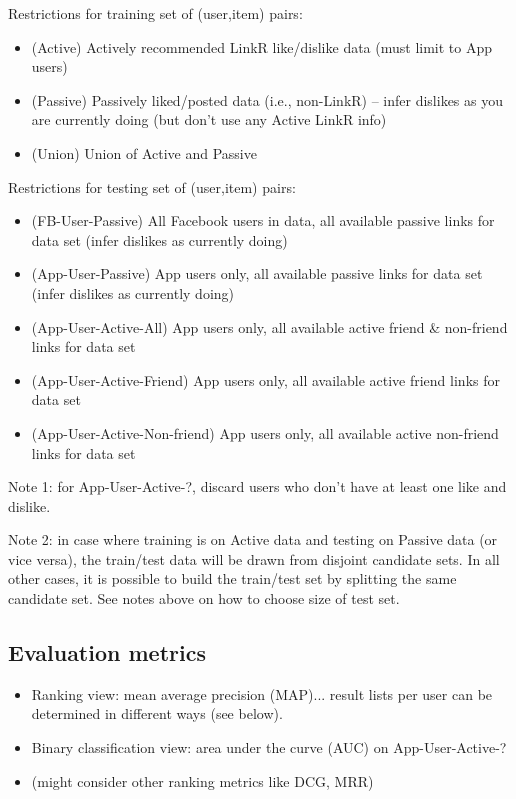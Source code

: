 \documentclass{sig-alternate}
\begin{document}
Restrictions for training set of (user,item) pairs:

\begin{itemize}
\item (Active) Actively recommended LinkR like/dislike data (must limit to App users)
\item (Passive) Passively liked/posted data (i.e., non-LinkR) -- infer dislikes as you are currently doing (but don't use any Active LinkR info) 
\item (Union) Union of Active and Passive
\end{itemize}

Restrictions for testing set of (user,item) pairs:

\begin{itemize}
\item (FB-User-Passive) All Facebook users in data, all available passive links for data set (infer dislikes as currently doing)
\item (App-User-Passive) App users only, all available passive links for data set (infer dislikes as currently doing)
\item (App-User-Active-All) App users only, all available active friend \& non-friend links for data set
\item (App-User-Active-Friend) App users only, all available active friend links for data set
\item (App-User-Active-Non-friend) App users only, all available active non-friend links for data set
\end{itemize}

Note 1: for App-User-Active-?, discard users who don't have at least one like and dislike.

Note 2: in case where training is on Active data and testing on Passive data (or vice versa), the train/test data will be drawn from disjoint candidate sets.  In all other cases, it is possible to build the train/test set by splitting the same candidate set.  See notes above on how to choose size of test set.

\subsection{Evaluation metrics}

\begin{itemize}
\item Ranking view: mean average precision (MAP)... result lists per user can be determined in different ways (see below).
\item Binary classification view: area under the curve (AUC) on App-User-Active-?
\item (might consider other ranking metrics like DCG, MRR)
\end{itemize}
\end{document}
